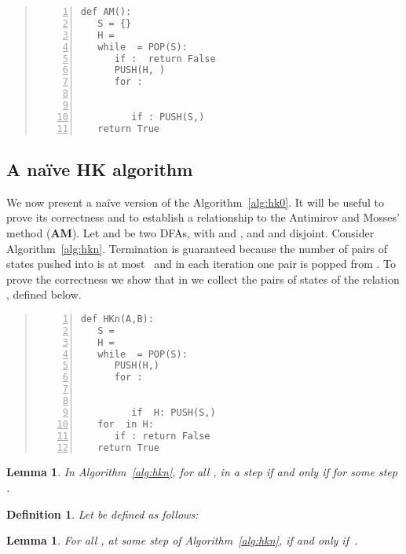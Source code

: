 \documentclass[copyright]{eptcs}
\makeatletter
\newtheorem{lemma}[theorem]{Lemma}
\newtheorem{definition}[theorem]{Definition\dromanb}
\newcommand*{\dromanb}{\gdef\d@tstyle{\rmfamily\upshape\mdseries}}
\newcommand{\d@tstyle}{}
\newcommand{\dfa}{DFA\xspace}
\newcommand{\hk}{\textbf{HK}\xspace}
\newcommand{\hkn}{\textbf{HKn}\xspace}
\newcommand{\am}{\textbf{AM}\xspace}
\makeatother
\begin{document}
\begin{quote}
\begin{lstlisting}[caption={A simplified version of algorithm~\am.},numbers=left,captionpos=b,label=alg:am]
def AM():
   S = {}
   H = 
   while  = POP(S):
      if :  return False
      PUSH(H, )
      for :
         
         
         if : PUSH(S,)
   return True
\end{lstlisting}
\end{quote}

\subsection{A na\"ive HK algorithm}
\label{subsec:naive}

We now present a na\"ive version of the Algorithm~\ref{alg:hk0}. It
will be useful to prove its correctness and to establish a
relationship to the Antimirov and Mosses' method (\am{}).
Let  and  be two \dfa{}s, with  and , and
 and  disjoint. Consider Algorithm~\ref{alg:hkn}. 
Termination is guaranteed because the number of pairs of states pushed
into  is at most~ and in each iteration one pair is popped from
.
To prove the correctness we show that in  we collect the pairs of
states of the relation , defined below.

\begin{quote}
\begin{lstlisting}[caption={The algorithm \hkn{}, a na\"ive version of \hk.},captionpos=b,numbers=left,label=alg:hkn]
def HKn(A,B):
   S = 
   H = 
   while  = POP(S):
      PUSH(H,)
      for :
         
         
         if  H: PUSH(S,)
   for  in H:
      if : return False
   return True
\end{lstlisting}
\end{quote}


\begin{lemma}\label{lem:3}
  In Algorithm~\ref{alg:hkn}, for all ,
   in a step  if and only if  for some
  step .
\end{lemma}

\begin{definition}
  \label{def:1}
  Let  be defined as follows:

\end{definition}

\begin{lemma} 
  \label{lem:4}
  For all ,  at some step of
  Algorithm~\ref{alg:hkn}, if and only if~.
\end{lemma}
\end{document}
